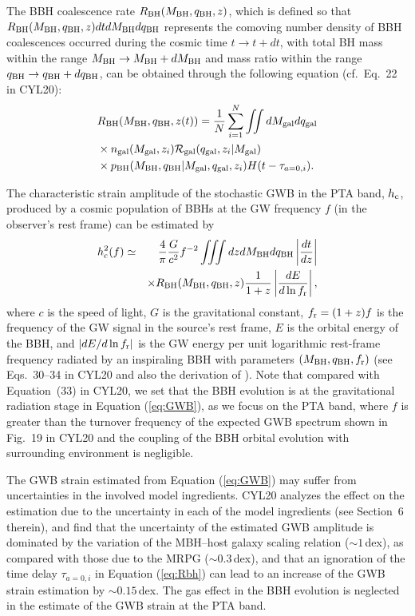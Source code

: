 \documentclass[twocolumn]{aastex631}
\newcommand{\calR}{{\mathcal{R}}}
\newcommand{\rmc}{_{\rm c}}
\newcommand{\rmr}{_{\rm r}}
\newcommand{\gal}{_{\rm gal}}
\newcommand{\bh}{_{\rm BH}}
\begin{document}
%
The BBH coalescence rate  $R\bh(M\bh,q\bh,z)$, which is defined so that
$R\bh(M\bh,q\bh,z) dt dM\bh dq\bh$ represents the comoving number density of
BBH coalescences occurred during the cosmic time $t \rightarrow t+dt$, with
total BH mass within the range $M\bh \rightarrow M\bh+dM\bh$ and mass ratio
within the range $q\bh \rightarrow q\bh+dq\bh$, can be obtained through
the following equation (cf.\ Eq.~22 in CYL20):
%
\begin{eqnarray}
%
& R\bh (M\bh,q\bh,z(t)) 
%
= \frac{1}{N} \sum_{i=1}^{N} \iint dM\gal dq\gal \nonumber \\
%
& \times n\gal(M\gal,z_i) \calR\gal(q\gal,z_i|M\gal)  \nonumber \\
%
& \times p\bh(M\bh,q\bh|M\gal,q\gal,z_i)H(t-\tau_{a=0,i}).
%
\label{eq:Rbh}
%
\end{eqnarray}

The characteristic strain amplitude of the stochastic GWB in the PTA band,
$h\rmc$, produced by a cosmic population of BBHs at the GW frequency $f$ (in the
observer's rest frame) can be estimated by
%
\begin{eqnarray}
%
h\rmc^2(f)\simeq && \frac{4}{\pi} \frac{G}{c^2}f^{-2} 
%
\iiint dz dM\bh dq\bh \left|\frac{dt}{dz}\right| \nonumber\\
%
&& \times R\bh(M\bh,q\bh,z) \frac{1}{1+z} \left|\frac{dE}{d\ln f\rmr}\right|,
%
\label{eq:GWB}
%
\end{eqnarray}
where $c$ is the speed of light, $G$ is the gravitational constant, 
%
$f\rmr= (1+z)f$ is the frequency of the GW signal in the source's rest frame,
%
$E$ is the orbital energy of the BBH,
and $|dE/d\ln f\rmr|$ is the GW energy per unit logarithmic rest-frame
frequency radiated by an inspiraling BBH with parameters $(M\bh, q\bh, f\rmr)$
%
(see Eqs.~30--34 in CYL20 and also the derivation of \citealt{Phinney01}). Note
that compared with Equation~(33) in CYL20,
we set that the BBH evolution is at the gravitational radiation stage in
Equation (\ref{eq:GWB}),
%
as we focus on the PTA band, where $f$ is greater than the turnover frequency of
the expected GWB spectrum shown in Fig.~19 in CYL20 and the coupling of the BBH orbital
evolution with surrounding environment is negligible.

The GWB strain estimated from Equation (\ref{eq:GWB}) may suffer from
uncertainties in the involved model ingredients. 
CYL20 analyzes the effect on the estimation due to the uncertainty in
each of the model ingredients (see Section~6 therein), and find that the
uncertainty of the estimated GWB amplitude is dominated by the variation of the
MBH--host galaxy scaling relation ($\sim 1$\,dex), as compared with those due
to the MRPG ($\sim 0.3$\,dex), and that an ignoration of the time delay
$\tau_{a=0,i}$ in Equation (\ref{eq:Rbh}) can lead to an increase of the GWB
strain estimation by $\sim 0.15$\,dex. The gas effect in the BBH evolution is
neglected in the estimate of the GWB strain at the PTA band.
%
\end{document}
